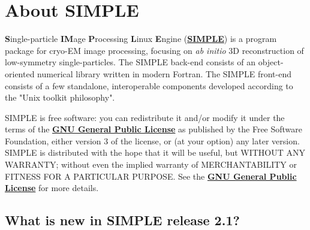 \documentclass[a4paper,11pt]{article}
\begin{document}
\tableofcontents{}
\clearpage

\section{About SIMPLE}

\textbf{S}ingle-particle \textbf{IM}age \textbf{P}rocessing \textbf{L}inux \textbf{E}ngine (\href{www.simplecryoem.com}{\textbf{\textcolor{BurntOrange}{SIMPLE}}}) is a program package for cryo-EM image processing, focusing on \textit{ab initio} 3D reconstruction of low-symmetry single-particles. The SIMPLE back-end consists of an object-oriented numerical library written in modern Fortran. The SIMPLE front-end consists of a few standalone, interoperable components developed according to the "Unix toolkit philosophy".

SIMPLE is free software: you can redistribute it and/or modify it under the terms of the \href{http://www.gnu.org/copyleft/gpl.html}{\textbf{\textcolor{BurntOrange}{GNU General Public License}}} as published by the Free Software Foundation, either version 3 of the license, or (at your option) any later version. SIMPLE is distributed with the hope that it will be useful, but WITHOUT ANY WARRANTY; without even the implied warranty of MERCHANTABILITY or FITNESS FOR A PARTICULAR PURPOSE. See the \href{http://www.gnu.org/copyleft/gpl.html}{\textbf{\textcolor{BurntOrange}{GNU General Public License}}} for more details.

\subsection{What is new in SIMPLE release 2.1?}
\end{document}
